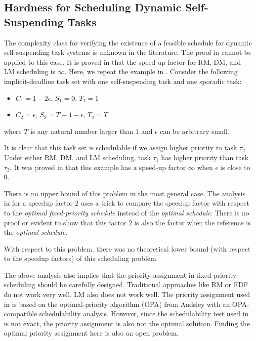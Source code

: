 \subsection{Hardness for Scheduling Dynamic Self-Suspending Tasks}
The complexity class for verifying the existence of a feasible schedule for dynamic self-suspending task systems is unknown in the literature. The proof in \cite{Ridouard_2004} cannot be applied to this case. 
It is proved in \cite{huangpass:dac2015} that the speed-up factor for RM, DM, and LM scheduling is $\infty$. Here, we repeat the example in \cite{huangpass:dac2015}. Consider the following implicit-deadline task set with one self-suspending task and one sporadic task:
\begin{itemize}
 \setlength\itemsep{0em}
\item $C_1=1-2\epsilon$, $S_1=0$, $T_1=1$
\item  $C_2=\epsilon$, $S_2=T-1-\epsilon$, $T_2=T$
\end{itemize}
where $T$ is any natural number larger than $1$ and $\epsilon$ can be arbitrary small.

It is clear that this task set is schedulable if we assign higher priority to
task $\tau_2$.
Under either RM, DM, and LM scheduling, task $\tau_1$ has higher priority than task $\tau_2$. It was proved in \cite{huangpass:dac2015} that this example has a speed-up factor $\infty$ when $\epsilon$ is close to $0$.

There is no upper bound of this problem in the most general case. The analysis in \cite{huangpass:dac2015} for a speedup factor $2$ uses a trick to compare the speedup factor with respect to the \emph{optimal fixed-priority schedule} instead of the \emph{optimal schedule}. There is no proof or evident to show that this factor $2$ is also the factor when the reference is the \emph{optimal schedule}.

With respect to this problem, there was no theoretical lower bound (with respect to the speedup factors) of this scheduling problem. 


The above analysis also implies that the priority assignment in fixed-priority scheduling should be carefully designed. Traditional approaches like RM or EDF do not work very well. LM also does not work well. The priority assignment used in \cite{huangpass:dac2015} is based on the optimal-priority algorithm (OPA) from Audsley \cite{audsley-1993} with an OPA-compatible schedulability analysis. However, since the schedulability test used in \cite{huangpass:dac2015}  is not exact, the priority assignment is also not the optimal solution.
Finding the optimal priority assignment here is also an open problem.


